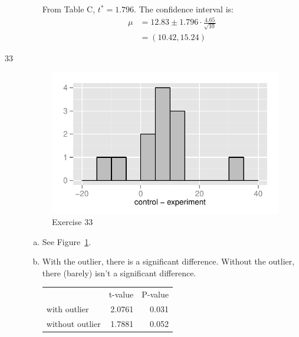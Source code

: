 \documentclass[letterpaper]{exam}
\begin{document}
\begin{description}
\begin{enumerate}[(a)]
            From Table C, $t^* = 1.796$. The confidence interval is:
            \begin{align*}
              \mu & = 12.83 \pm 1.796 \cdot \frac{4.65}{\sqrt{10}} \\
                  & = (10.42, 15.24)
            \end{align*}
        \end{enumerate}

      \item[33]
        \begin{figure}[H]
          \centering
          \includegraphics[scale = 1.0]{figures/ex33.pdf}
          \caption{Exercise 33}\label{fig:ex33}
        \end{figure}

        \begin{enumerate}[(a)]
          \item See Figure~\ref{fig:ex33}.

          \item 
            With the outlier, there is a significant difference. Without the
            outlier, there (barely) isn't a significant difference.

            \begin{tabular}[H]{lrr}
                              & t-value & P-value \\
              with outlier    & 2.0761  & 0.031 \\
              without outlier & 1.7881  & 0.052 \\
            \end{tabular}

        \end{enumerate}


\end{description}
\end{document}
